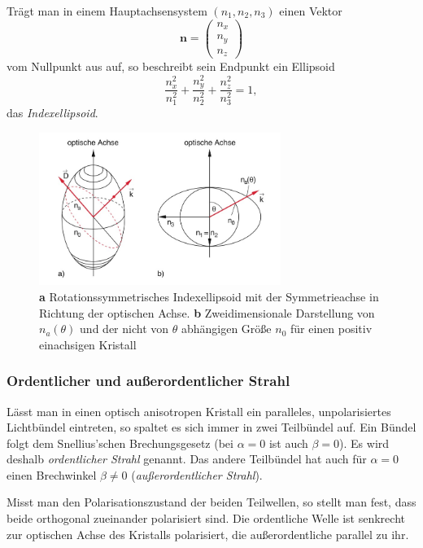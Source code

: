 \documentclass[a4paper, 11pt, ngerman, parskip=half-]{scrartcl}
\begin{document}
Trägt man in einem Hauptachsensystem $(n_1, n_2, n_3)$ einen Vektor
\[\textbf{n} = \begin{pmatrix}
        n_x \\
        n_y \\
        n_z
    \end{pmatrix}\]
vom Nullpunkt aus auf, so beschreibt sein Endpunkt ein Ellipsoid
\[\frac{n_x^2}{n_1^2} + \frac{n_y^2}{n_2^2} + \frac{n_z^2}{n_3^2} = 1,\]
das \textit{Indexellipsoid}.
%
\begin{figure}[H]
    \centering
    \begin{samepage}
        \includegraphics[width=0.7\textwidth]{image/15/einachsiger_kristall.jpg}
        \caption{\textbf{a} Rotationssymmetrisches Indexellipsoid mit der Symmetrieachse in Richtung der optischen Achse. \textbf{b} Zweidimensionale Darstellung von $n_a(\theta)$ und der nicht von $\theta$ abhängigen Größe $n_0$ für einen positiv einachsigen Kristall}
        \label{fig:indexellipsoid_einachsig}
    \end{samepage}
\end{figure}
%
\subsubsection*{Ordentlicher und außerordentlicher Strahl}
%
Lässt man in einen optisch anisotropen Kristall ein paralleles, unpolarisiertes Lichtbündel eintreten, so spaltet es sich immer in zwei Teilbündel auf. Ein Bündel folgt dem Snellius'schen Brechungsgesetz (bei $\alpha = 0$ ist auch $\beta = 0$). Es wird deshalb \textit{ordentlicher Strahl} genannt. Das andere Teilbündel hat auch für $\alpha = 0$ einen Brechwinkel $\beta \neq 0$ (\textit{außerordentlicher Strahl}).

Misst man den Polarisationszustand der beiden Teilwellen, so stellt man fest, dass beide orthogonal zueinander polarisiert sind. Die ordentliche Welle ist senkrecht zur optischen Achse des Kristalls polarisiert, die außerordentliche parallel zu ihr.
\end{document}
